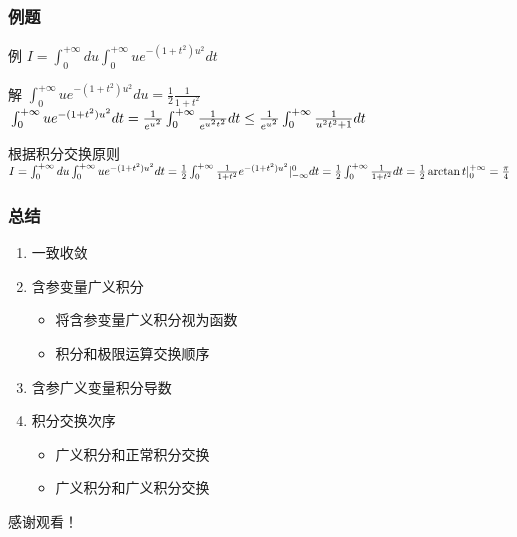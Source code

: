 \documentclass[xetex]{beamer}
\begin{document}
\begin{frame}
    \frametitle{例题}
    \begin{block}{例}
        $I=\int_0^{+\infty}{du}\int_0^{+\infty}{ue^{-(1+t^2)u^2}dt}$
    \end{block}
    \begin{block}{解}
        $\int_0^{+\infty}{ue^{-(1+t^2)u^2}du}=\frac{1}{2}\frac{1}{1+t^2}$
        $\newline \int_0^{+\infty}{ue^{-(1+t^2)u^2}dt}=\frac{1}{e^{u^2}}\int_0^{+\infty}{\frac{1}{e^{u^2t^2}}dt} \le \frac{1}{e^{u^2}}\int_0^{+\infty}{\frac{1}{u^2t^2+1}dt}$
        
        根据积分交换原则
        $\newline I=\int_0^{+\infty}{du}\int_0^{+\infty}{ue^{-(1+t^2)u^2}dt}
        \newline=\frac{1}{2}\int_0^{+\infty}{\frac{1}{1+t^2}e^{-(1+t^2)u^2}|^{0}_{-\infty}dt}
        \newline=\frac{1}{2}\int_0^{+\infty}{\frac{1}{1+t^2}dt}
        \newline=\frac{1}{2}\arctan t|^{+\infty}_0=\frac{\pi}{4}$
    \end{block}
\end{frame}

\begin{frame}
    \frametitle{总结}
    \begin{enumerate}
        \item 一致收敛
        \item 含参变量广义积分
        \begin{itemize}
            \item 将含参变量广义积分视为函数
            \item 积分和极限运算交换顺序
        \end{itemize}
        \item 含参广义变量积分导数
        
        \item 积分交换次序
        \begin{itemize}
            \item 广义积分和正常积分交换
            \item 广义积分和广义积分交换
        \end{itemize}
    \end{enumerate}

\end{frame}

\begin{frame}[standout]
    \Huge 感谢观看！

\end{frame}
\end{document}
